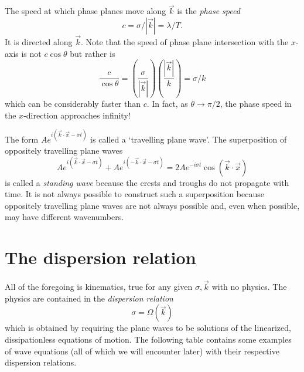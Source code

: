 \sourcepagebreak

\par\smallskip
\begin{center}
	
	\wavefiguremark
\end{center}
\smallskip

The speed at which phase planes move along $\vec{k}$ is the \emph{phase speed}
\[
	c=\sigma/|\vec{k}|=\lambda/T.
\]
It is directed along $\vec{k}$. Note that the speed of phase plane intersection with the
$x$-axis is not $c\cos\theta$ but rather is
\[
	\frac{c}{\cos\theta}
	=\left(\frac{\sigma}{|\vec{k}|}\right)
	\left(\frac{|\vec{k}|}{k}\right)
	=\sigma/k
\]
which can be considerably faster than $c$. In fact, as $\theta\to\pi/2$, the phase
speed in the $x$-direction approaches infinity!

The form $Ae^{i(\vec{k}\cdot\vec{x}-\sigma t)}$ is called a `travelling plane wave'.
The superposition of oppositely travelling plane waves
\[
	Ae^{i(\vec{k}\cdot\vec{x}-\sigma t)}
	+Ae^{i(-\vec{k}\cdot\vec{x}-\sigma t)}
	=2Ae^{-i\sigma t}\cos(\vec{k}\cdot\vec{x})
\]
is called a \emph{standing wave} because the crests and troughs do not propagate with
time. It is not always possible to construct such a superposition because oppositely
travelling plane waves are not always possible and, even when possible, may have
different wavenumbers.

\sourcepagebreak

\section{The dispersion relation}

All of the foregoing is kinematics, true for any given $\sigma,\vec{k}$ with no physics.
The physics are contained in the \emph{dispersion relation}
\[
	\sigma=\Omega(\vec{k})
\]
which is obtained by requiring the plane waves to be solutions of the linearized,
dissipationless equations of motion. The following table contains some examples of wave
equations (all of which we will encounter later) with their respective dispersion
relations.

